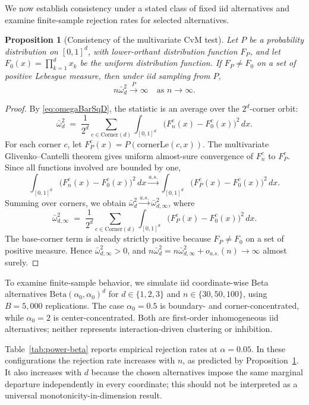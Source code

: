 \documentclass[pdflatex]{sn-jnl}
\theoremstyle{thmstyleone}
\newtheorem{proposition}[theorem]{Proposition}
\theoremstyle{thmstyletwo}
\theoremstyle{thmstylethree}
\begin{document}
We now establish consistency under a stated class of fixed iid alternatives and examine finite-sample rejection rates for selected alternatives.

\begin{proposition}[Consistency of the multivariate CvM test]\label{prop:consistency}
Let $P$ be a probability distribution on $[0,1]^d$, with lower-orthant distribution function $F_P$, and let $F_0(x)=\prod_{k=1}^d x_k$ be the uniform distribution function. If $F_P\ne F_0$ on a set of positive Lebesgue measure, then under iid sampling from $P$,
\[
  n\bar\omega^2_d \xrightarrow{P} \infty \quad \text{as } n\to\infty.
\]
\end{proposition}

\begin{proof}
By \eqref{eq:omegaBarSqD}, the statistic is an average over the $2^d$-corner orbit:
\[
  \bar\omega^2_d \;=\; \frac{1}{2^d}\sum_{c\in\mathrm{Corner}(d)}\int_{[0,1]^d}\bigl(F_n^c(x) - F_0^c(x)\bigr)^2\,dx.
\]
For each corner $c$, let $F_P^c(x)=P(\mathrm{cornerLe}(c,x))$. The multivariate Glivenko--Cantelli theorem gives uniform almost-sure convergence of $F_n^c$ to $F_P^c$. Since all functions involved are bounded by one,
\[
  \int_{[0,1]^d}\bigl(F_n^c(x) - F_0^c(x)\bigr)^2\,dx \xrightarrow{a.s.} \int_{[0,1]^d}\bigl(F_P^c(x) - F_0^c(x)\bigr)^2\,dx.
\]
Summing over corners, we obtain $\bar\omega^2_d \xrightarrow{a.s.} \bar\omega^2_{d, \infty}$, where
\[
  \bar\omega^2_{d,\infty} \;=\; \frac{1}{2^d}\sum_{c\in\mathrm{Corner}(d)}\int_{[0,1]^d}\bigl(F_P^c(x) - F_0^c(x)\bigr)^2\,dx.
\]
The base-corner term is already strictly positive because $F_P\ne F_0$ on a set of positive measure. Hence $\bar\omega^2_{d,\infty}>0$, and $n\bar\omega^2_d=n\bar\omega^2_{d,\infty}+o_{a.s.}(n)\to\infty$ almost surely.
\end{proof}

To examine finite-sample behavior, we simulate iid coordinate-wise Beta alternatives $\mathrm{Beta}(\alpha_0,\alpha_0)^d$ for $d\in\{1,2,3\}$ and $n\in\{30,50,100\}$, using $B=5{,}000$ replications. The case $\alpha_0=0.5$ is boundary- and corner-concentrated, while $\alpha_0=2$ is center-concentrated. Both are first-order inhomogeneous iid alternatives; neither represents interaction-driven clustering or inhibition.

Table~\ref{tab:power-beta} reports empirical rejection rates at $\alpha=0.05$. In these configurations the rejection rate increases with $n$, as predicted by Proposition~\ref{prop:consistency}. It also increases with $d$ because the chosen alternatives impose the same marginal departure independently in every coordinate; this should not be interpreted as a universal monotonicity-in-dimension result.
\end{document}
